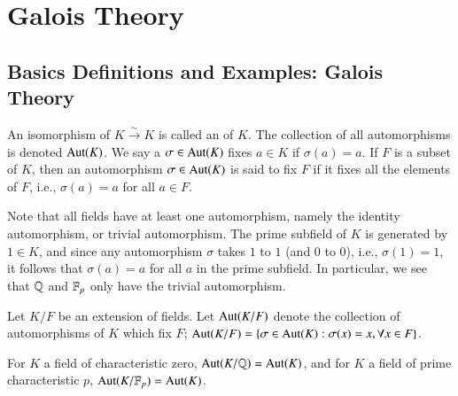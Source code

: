 \chapter{ Galois Theory}\label{GaloisTheory}


\section{ Basics Definitions and Examples: Galois Theory}


\begin{definition}
    An isomorphism of $K\xrightarrow{\sim} K$ is called an  of $K$. The collection of all automorphisms is denoted $\operatorname{Aut}(K)$. We say a $\sigma \in \operatorname{Aut}(K)$ fixes $a \in K$ if $\sigma(a) = a$. If $F$ is a subset of $K$, then an automorphism $\sigma \in \operatorname{Aut}(K)$ is said to fix $F$ if it fixes all the elements of $F$, i.e., $\sigma(a) =a$ for all $a \in F$.
\end{definition}

Note that all fields have at least one automorphism, namely the identity automorphism, or trivial automorphism. The prime subfield of $K$ is generated by $1 \in K$, and since any automorphism $\sigma$ takes $1$ to $1$ (and $0$ to $0$), i.e., $\sigma(1) = 1$, it follows that $\sigma(a) = a$ for all $a$ in the prime subfield. In particular, we see that $\mathbb Q$ and $\mathbb F_p$ only have the trivial automorphism.

\begin{definition}
    Let $K/F$ be an extension of fields. Let $\operatorname{Aut}(K/F)$ denote the collection of automorphisms of $K$ which fix $F$; $\operatorname{Aut}(K/F) = \{\sigma \in \operatorname{Aut}(K):\sigma(x) = x,\forall x \in F\}$.
\end{definition}

\begin{example}
    For $K$ a field of characteristic zero, $\operatorname{Aut}(K/\mathbb Q) = \operatorname{Aut}(K)$, and for $K$ a field of prime characteristic $p$, $\operatorname{Aut}(K/\mathbb F_p) = \operatorname{Aut}(K)$.
\end{example}

